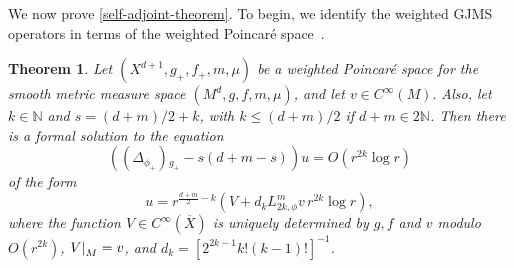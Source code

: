 \documentclass{amsart}
\newcommand\restr[2]{{%
  \left.\kern-\nulldelimiterspace %
  #1 %
  \right|_{#2} %
  }}
\newtheorem{theorem}{Theorem}[section]
\begin{document}
We now prove \cref{self-adjoint-theorem}. To begin, we identify the weighted GJMS operators in terms of the weighted Poincar\'e space~\cites{CaseKhaitan2022}.
\begin{theorem}
\label{differential-equation-solution}
Let $(X^{d+1}, g_+,f_+,m,\mu)$ be a weighted Poincar\'e space \cites{CaseKhaitan2022} for the smooth metric measure space $(M^d,g,f,m,\mu)$, and let $v \in C^{\infty}(M) .$ Also, let $k \in \mathbb{N}$ and $s=(d+m)/2+k$, with $k\leq (d+m)/2$ if $d+m\in 2\mathbb{N}$. Then there is a formal solution to the equation 
\begin{equation*}
\label{differential-equation}
\left((\Delta_{\phi_{+}}){}_{g_+}-s(d+m-s)\right) u=O\left(r^{2k}\log r\right)
\end{equation*}
of the form
\begin{equation*}
\label{4.2}
u=r^{\frac{d+m}{2}-k}\left(V+ d_k L_{2k,\phi}^m v\, r^{2k} \log r \right),
\end{equation*}
where the function $V \in C^{\infty}(\overline{X})$ is uniquely determined by $g,f$ and $v$ modulo $O\left(r^{2k}\right)$, $\restr{V}{{M}}=v$, and $d_k=[2^{2k-1}k!(k-1)!]^{-1}$.


\end{theorem}
\end{document}
